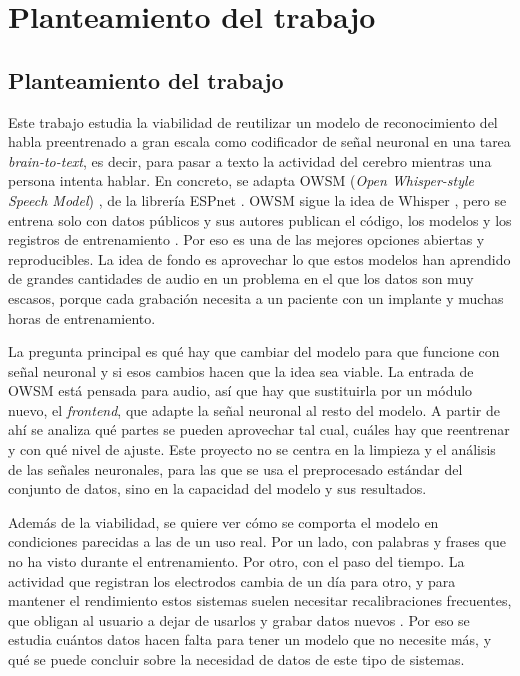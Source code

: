 
\chapter{Planteamiento del trabajo}
\label{cap:planteamiento}

\section{Planteamiento del trabajo}
\label{sec:planteamiento}

Este trabajo estudia la viabilidad de reutilizar un modelo de reconocimiento del habla preentrenado a gran escala como codificador de señal neuronal en una tarea \textit{brain-to-text}, es decir, para pasar a texto la actividad del cerebro mientras una persona intenta hablar. En concreto, se adapta OWSM (\textit{Open Whisper-style Speech Model}) \cite{peng2023owsm,peng2024owsmv31}, de la librería ESPnet \cite{watanabe2018espnet,someki2024espnetez}. OWSM sigue la idea de Whisper \cite{radford2023whisper}, pero se entrena solo con datos públicos y sus autores publican el código, los modelos y los registros de entrenamiento \cite{peng2024owsmv31}. Por eso es una de las mejores opciones abiertas y reproducibles. La idea de fondo es aprovechar lo que estos modelos han aprendido de grandes cantidades de audio en un problema en el que los datos son muy escasos, porque cada grabación necesita a un paciente con un implante y muchas horas de entrenamiento.

La pregunta principal es qué hay que cambiar del modelo para que funcione con señal neuronal y si esos cambios hacen que la idea sea viable. La entrada de OWSM está pensada para audio, así que hay que sustituirla por un módulo nuevo, el \textit{frontend}, que adapte la señal neuronal al resto del modelo. A partir de ahí se analiza qué partes se pueden aprovechar tal cual, cuáles hay que reentrenar y con qué nivel de ajuste. Este proyecto no se centra en la limpieza y el análisis de las señales neuronales, para las que se usa el preprocesado estándar del conjunto de datos, sino en la capacidad del modelo y sus resultados.

Además de la viabilidad, se quiere ver cómo se comporta el modelo en condiciones parecidas a las de un uso real. Por un lado, con palabras y frases que no ha visto durante el entrenamiento. Por otro, con el paso del tiempo. La actividad que registran los electrodos cambia de un día para otro, y para mantener el rendimiento estos sistemas suelen necesitar recalibraciones frecuentes, que obligan al usuario a dejar de usarlos y grabar datos nuevos \cite{fan2023corp}. Por eso se estudia cuántos datos hacen falta para tener un modelo que no necesite más, y qué se puede concluir sobre la necesidad de datos de este tipo de sistemas.

